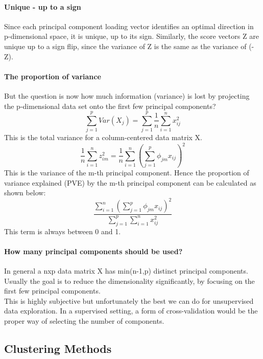 \documentclass[../document.tex]{subfiles}
\begin{document}
	\paragraph{Unique - up to a sign}
	Since each principal component loading vector identifies an optimal direction in p-dimensional space, it is unique, up to its sign. Similarly, the score vectors Z are unique up to a sign flip, since the variance of Z is the same as the variance of (-Z).

	\paragraph{The proportion of variance}
	But the question is now how much information (variance) is lost by projecting the p-dimensional data set onto the first few principal components?
	\begin{equation}
		\sum_{j=1}^{p}Var(X_{j})=\sum_{j=1}^{p}\frac{1}{n}\sum_{i=1}^{n}x_{ij}^2
	\end{equation}
	This is the total variance for a column-centered data matrix X.
	\begin{equation}
		\frac{1}{n}\sum_{i=1}^{n}z_{im}^2=\frac{1}{n}\sum_{i=1}^{n}(\sum_{j=1}^{p}\phi_{jm}x_{ij})^2
	\end{equation}
	This is the variance of the m-th principal component. Hence the proportion of variance explained (PVE) by the m-th principal component can be calculated as shown below:
	\begin{equation}
		\frac{\sum_{i=1}^{n}(\sum_{j=1}^{p}\phi_{jm}x_{ij})^2}{\sum_{j=1}^{p}\sum_{i=1}^{n}x_{ij}^2}
	\end{equation}
	This term is always between 0 and 1.

	\paragraph{How many principal components should be used?}
	In general a nxp data matrix X has min(n-1,p) distinct principal components. Usually the goal is to reduce the dimensionality significantly, by focusing on the first few principal components.\\
	This is highly subjective but unfortunately the best we can do for unsupervised data exploration. In a supervised setting, a form of cross-validation would be the proper way of selecting the number of components.

	\subsection{Clustering Methods}
\end{document}
